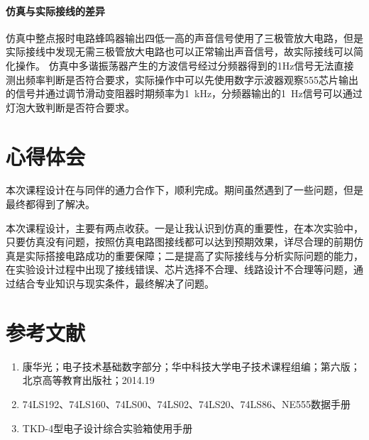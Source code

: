 \documentclass[lang=cn, 11pt, a4paper, cite=authornum, ctexfont]{paper}
\begin{document}
\paragraph{仿真与实际接线的差异}

仿真中整点报时电路蜂鸣器输出四低一高的声音信号使用了三极管放大电路，但是实际接线中发现无需三极管放大电路也可以正常输出声音信号，故实际接线可以简化操作。
仿真中多谐振荡器产生的方波信号经过分频器得到的1Hz信号无法直接测出频率判断是否符合要求，实际操作中可以先使用数字示波器观察555芯片输出的信号并通过调节滑动变阻器时期频率为\SI{1}{\kilo\hertz}，分频器输出的\SI{1}{\hertz}信号可以通过灯泡大致判断是否符合要求。


\section{心得体会}

本次课程设计在与同伴的通力合作下，顺利完成。期间虽然遇到了一些问题，但是最终都得到了解决。

本次课程设计，主要有两点收获。一是让我认识到仿真的重要性，在本次实验中，只要仿真没有问题，按照仿真电路图接线都可以达到预期效果，详尽合理的前期仿真是实际搭接电路成功的重要保障；二是提高了实际接线与分析实际问题的能力，在实验设计过程中出现了接线错误、芯片选择不合理、线路设计不合理等问题，通过结合专业知识与现实条件，最终解决了问题。

\section{参考文献}

\begin{enumerate}
	\item 康华光；电子技术基础数字部分；华中科技大学电子技术课程组编；第六版；北京高等教育出版社；2014.19
	\item 74LS192、74LS160、74LS00、74LS02、74LS20、74LS86、NE555数据手册
	\item TKD-4型电子设计综合实验箱使用手册
\end{enumerate}
\end{document}
